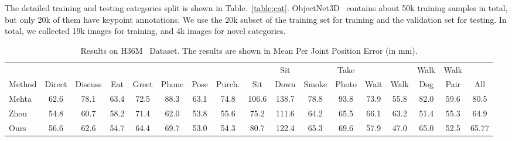 \documentclass[runningheads]{llncs}
\begin{document}
The detailed training and testing categories split is shown in Table.~\ref{table:cat}.
ObjectNet3D~\cite{xiang2016objectnet3d} contains about 50k training samples in total, but only 20k of them have keypoint annotations. 
We use the 20k subset of the training set for training and the validation set for testing. In total, we collected 19k images for training, and 4k images for novel categories.


\begin{table}[t]
\scriptsize
{}
\end{table}
\begin{table}[t]
\tiny
\centering
\renewcommand{\tabcolsep}{1pt}
\begin{tabular}{l|c|c|c|c|c|c|c|c|c|c|c|c|c|c|c|c}
\hline
                &        &         &        &       &       &        &        &         & Sit   &       & Take  &       &       & Walk  & Walk  & \multicolumn{1}{l}{} \\
\multicolumn{1}{c|}{Method}                      & Direct & Discuss & Eat & Greet & Phone & Pose & Purch. & Sit & Down  & Smoke & Photo & Wait  & Walk  & Dog   & Pair  & All                  \\ \hline 
Mehta~\cite{VNect_SIGGRAPH2017}  &62.6 & 78.1 & 63.4 & 72.5 & 88.3 & 63.1 & 74.8 & 106.6 & 138.7 & 78.8 & 93.8 & 73.9 & 55.8 & 82.0& 59.6 & 80.5\\
Zhou~\cite{Zhou_2017_ICCV}     & 54.8   & 60.7   & 58.2   & 71.4 & 62.0 & 53.8  & 55.6  & 75.2 & 111.6 & 64.2 & 65.5  &  66.1 & 63.2  & 51.4 & 55.3  & 64.9                \\
Ours  & 56.6    &  62.6    &     54.7 & 64.4   & 69.7 & 53.0  & 54.3    & 80.7 &122.4  & 65.3 &69.6  & 57.9  & 47.0 & 65.0  & 52.5  & 65.77 \\
\hline
\end{tabular}
{\caption{Results on H36M~\cite{h36m_pami} Dataset. The results are shown in Mean Per Joint Position Error (in mm).}\label{Table:H36M}}

\vspace{-0.3cm}
\end{table}
\end{document}
